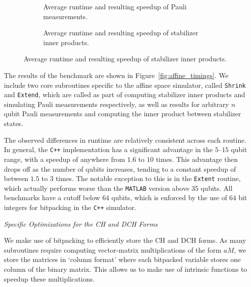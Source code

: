 \begin{figure}[p]\ContinuedFloat
\begin{subfigure}[t]{0.9\textwidth}
    \begin{scaletikzpicturetowidth}{\textwidth}
        
    \end{scaletikzpicturetowidth}
    \caption{Average runtime and resulting speedup of Pauli measurements.}
\end{subfigure}
\begin{subfigure}[t]{0.9\textwidth}
    \caption{Average runtime and resulting speedup of stabilizer inner products.}
    \begin{scaletikzpicturetowidth}{\textwidth}
        
    \end{scaletikzpicturetowidth}
\end{subfigure}
\end{figure}
The results of the benchmark are shown in Figure~\ref{fig:affine_timings}. We include two core subroutines specific to the affine space simulator, called \texttt{Shrink} and \texttt{Extend}, which are called as part of computing stabilizer inner products and simulating Pauli measurements respectively, as well as results for arbitrary $n$ qubit Pauli measurements and computing the inner product between stabilizer states.\par
The observed differences in runtime are relatively consistent across each routine. In general, the \texttt{C++} implementation has a significant advantage in the $5$--$15$ qubit range, with a speedup of anywhere from $1.6$ to $10$ times. This advantage then drops off as the number of qubits increases, tending to a constant speedup of between $1.5$ to $3$ times. The notable exception to this is in the \texttt{Extent} routine, which actually performs worse than the \texttt{MATLAB} version above $35$ qubits. All benchmarks have a cutoff below $64$ qubits, which is enforced by the use of $64$ bit integers for bitpacking in the \texttt{C++} simulator.
\par
\large{\itshape{Specific Optimizations for the CH and DCH Forms}}\par
We make use of bitpacking to efficiently store the CH and DCH forms. As many subroutines require computing vector-matrix multiplications of the form $aM$, we store the matrices in `column format' where each bitpacked variable stores one column of the binary matrix. This allows us to make use of intrinsic functions to speedup these multiplications.\par
